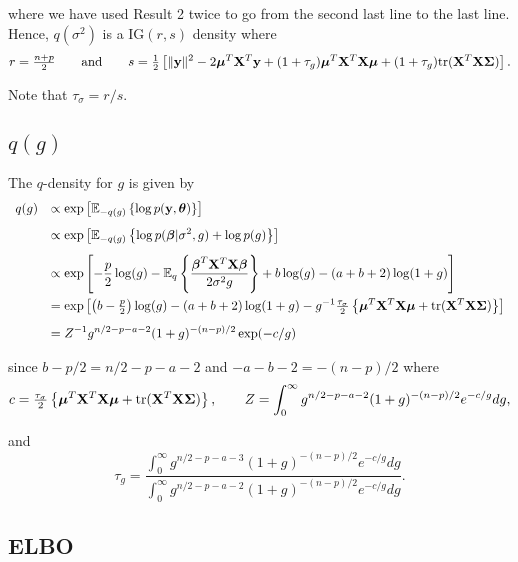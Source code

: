 \documentclass{article}
\def\vectorfontone{\bf}
\def\vectorfonttwo{\boldsymbol}
\def\vy{{\vectorfontone y}}                      %
\def\vbeta{{\vectorfonttwo \beta}}               %
\def\vtheta{{\vectorfonttwo \theta}}             %
\def\vmu{{\vectorfonttwo \mu}}                   %
\def\matrixfontone{\bf}
\def\matrixfonttwo{\boldsymbol}
\def\mX{{\matrixfontone X}}                      %
\def\mSigma{{\matrixfonttwo \Sigma}}             %
\def\bE{{\mathbb E}}                             %
\def\ds{\displaystyle}
\begin{document}
\noindent where we have used Result 2 twice to go from 
the second last line to the last line.
Hence, $q(\sigma^2)$ is a $\mbox{IG}(r,s)$ density where
$$
\ds r = \tfrac{n+p}{2}
\qquad \mbox{and} \qquad 
s  = \tfrac{1}{2}\left[ \|\vy\|^2 
- 2\vmu^T\mX^T\vy 
+ (1 + \tau_g)\vmu^T\mX^T\mX\vmu  
+ (1 + \tau_g)\mbox{tr}(\mX^T\mX\mSigma)
\right].
$$

\noindent Note that $\tau_\sigma = r/s$.


\subsection{$q(g)$}


\noindent The $q$-density for $g$ is given by
$$
\begin{array}{rl}
q(g)
& \ds \propto \exp\left[ \bE_{-q(g)} \left\{ \log p(\vy,\vtheta) \right\} \right]
\\ [2ex]
& \ds \propto \exp\left[ \bE_{-q(g)} \left\{ 
\log p(\vbeta|\sigma^2,g) 
+ \log p(g) 
\right\} \right]
\\ [2ex]
& \ds \propto \exp\left[
- \frac{p}{2}\log(g) 
- \bE_q\left\{ \frac{\vbeta^T\mX^T\mX\vbeta}{2\sigma^2 g} \right\}
+ b\log(g) - (a+b+2)\log(1 + g)
\right]
\\ [3ex]
& \ds = \exp\left[
\left( b - \tfrac{p}{2}\right) \log(g) 
- (a+b+2)\log(1 + g)
- g^{-1}\tfrac{\tau_\sigma}{2}\left\{\vmu^T\mX^T\mX\vmu + \mbox{tr}(\mX^T\mX\mSigma) \right\} 
\right]

\\ [2ex]
& \ds = Z^{-1} g^{n/2 - p - a - 2}(1 + g)^{-(n - p)/2}
\exp(
- c/g
)
\end{array}
$$

\noindent since $b - p/2 = n/2 - p - a - 2$ and $-a-b-2 = - (n-p)/2$
where
$$
\ds c = \tfrac{\tau_\sigma}{2}\left\{ \vmu^T\mX^T\mX\vmu + \mbox{tr}(\mX^T\mX\mSigma)\right\},
\qquad 
Z = \int_0^\infty g^{n/2 - p - a - 2}(1 + g)^{-(n-p)/2}e^{-c/g} dg,
$$

\noindent  and
$$
\tau_g = \frac{\ds \int_0^\infty g^{n/2 - p - a - 3}(1 + g)^{-(n-p)/2}e^{-c/g} dg}{
	\ds \int_0^\infty g^{n/2 - p - a - 2}(1 + g)^{-(n-p)/2}e^{-c/g} dg}.
$$


\subsection{ELBO}
\end{document}
